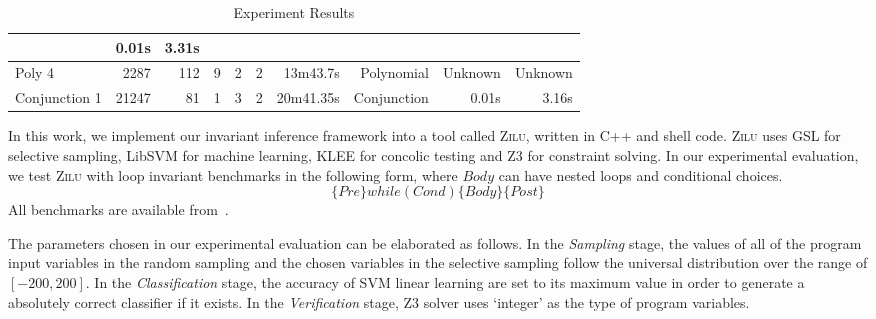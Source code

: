 \begin{table*}[t]
\begin{center}
\begin{center}
\begin{adjustbox}{max width=1\textwidth}
\begin{tabular}{l | r | r | r | r | r | r | r | r | r}
            & 0.01s & 3.31s 
            \\
        \hline
        Poly 4 
            & 2287 & 112 & 9
            & 2 & 2
            & 13m43.7s & Polynomial
            & Unknown & Unknown 
            \\
        \hline
        Conjunction 1
            & 21247 & 81 & 1 
            & 3 & 2 
            & 20m41.35s & Conjunction
            & 0.01s & 3.16s
            \\
        \hline
    \end{tabular}
    \end{adjustbox}
    \end{center}
    \end{center}
    \caption{Experiment Results}
    \label{tab:experiments}
\end{table*}

In this work, we implement our invariant inference framework into a tool called \textsc{Zilu}, 
written in C++ and shell code. 
\textsc{Zilu} uses GSL for selective sampling, LibSVM for machine learning, 
KLEE for concolic testing and Z3 for constraint solving. 
In our experimental evaluation, 
we test \textsc{Zilu} with  loop invariant benchmarks 
in the following form, where $\mathit{Body}$ can have nested loops and conditional choices. 
\[
    \{ \mathit{Pre} \} \mathit{while}(\mathit{Cond}) \{ \mathit{Body} \} \{ \mathit{Post} \}
\]
All benchmarks are available from~\cite{zilu}. 

The parameters chosen in our experimental evaluation can be elaborated as follows. 
In the \emph{Sampling} stage, 
the values of all of the program input variables in the random sampling 
and the chosen variables in the selective sampling 
follow the universal distribution over the range of $[-200, 200]$. 
In the \emph{Classification} stage, 
the accuracy of SVM linear learning are set to its maximum value 
in order to generate a absolutely correct classifier if it exists. 
In the \emph{Verification} stage, 
Z3 solver uses `integer' as the type of program variables. 


